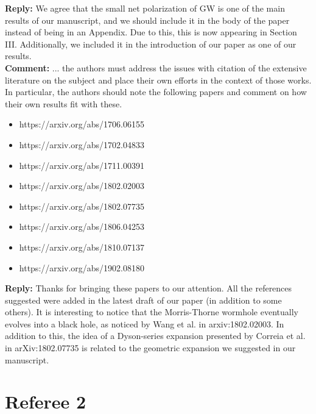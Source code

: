 \documentclass[preprintnumbers,floats,floatfix,amssymb,prd,onecolumn,superscriptaddress,nofootinbib]{revtex4}
\begin{document}
\textbf{Reply:} We agree that the small net polarization of GW is one of the main results of our manuscript, and we should include it in the body of the paper instead of being in an Appendix. Due to this, this is now appearing in Section III. Additionally, we included it in the introduction of our paper as one of our results.\\
  
\textbf{Comment:} ... the authors must address the issues with citation of the extensive literature on the subject and place their own efforts in the context of those works. In particular, the authors should note the following papers and comment on how their own results fit with these.\\  
\begin{itemize}
\item{https://arxiv.org/abs/1706.06155}\\
\item{https://arxiv.org/abs/1702.04833}\\
\item{https://arxiv.org/abs/1711.00391}\\
\item{https://arxiv.org/abs/1802.02003}\\
\item{https://arxiv.org/abs/1802.07735}\\
\item{https://arxiv.org/abs/1806.04253}\\
\item{https://arxiv.org/abs/1810.07137}\\
\item{https://arxiv.org/abs/1902.08180}\\
\end{itemize}


\textbf{Reply:}
Thanks for bringing these papers to our attention. All the references suggested were added in the latest draft of our paper (in addition to some others). It is interesting to notice that the Morris-Thorne wormhole eventually evolves into a black hole, as noticed by Wang et al. in arxiv:1802.02003. In addition to this, the idea of a Dyson-series expansion presented by Correia et al. in arXiv:1802.07735 is related to the geometric expansion we suggested in our manuscript.\\ 

\section{Referee 2}
\end{document}
